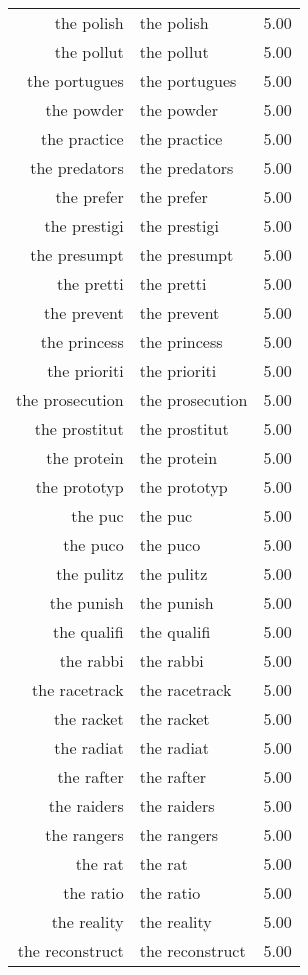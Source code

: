 \begin{table}[ht]
\begin{tabular}{rlr}
  the polish & the polish & 5.00 \\ 
  the pollut & the pollut & 5.00 \\ 
  the portugues & the portugues & 5.00 \\ 
  the powder & the powder & 5.00 \\ 
  the practice & the practice & 5.00 \\ 
  the predators & the predators & 5.00 \\ 
  the prefer & the prefer & 5.00 \\ 
  the prestigi & the prestigi & 5.00 \\ 
  the presumpt & the presumpt & 5.00 \\ 
  the pretti & the pretti & 5.00 \\ 
  the prevent & the prevent & 5.00 \\ 
  the princess & the princess & 5.00 \\ 
  the prioriti & the prioriti & 5.00 \\ 
  the prosecution & the prosecution & 5.00 \\ 
  the prostitut & the prostitut & 5.00 \\ 
  the protein & the protein & 5.00 \\ 
  the prototyp & the prototyp & 5.00 \\ 
  the puc & the puc & 5.00 \\ 
  the puco & the puco & 5.00 \\ 
  the pulitz & the pulitz & 5.00 \\ 
  the punish & the punish & 5.00 \\ 
  the qualifi & the qualifi & 5.00 \\ 
  the rabbi & the rabbi & 5.00 \\ 
  the racetrack & the racetrack & 5.00 \\ 
  the racket & the racket & 5.00 \\ 
  the radiat & the radiat & 5.00 \\ 
  the rafter & the rafter & 5.00 \\ 
  the raiders & the raiders & 5.00 \\ 
  the rangers & the rangers & 5.00 \\ 
  the rat & the rat & 5.00 \\ 
  the ratio & the ratio & 5.00 \\ 
  the reality & the reality & 5.00 \\ 
  the reconstruct & the reconstruct & 5.00 \\ 

\end{tabular}
\end{table}
